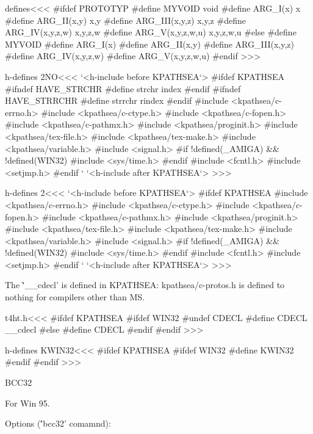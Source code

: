 {\<defines\><<<
#ifdef PROTOTYP
#define MYVOID void
#define ARG_I(x) x
#define ARG_II(x,y) x,y
#define ARG_III(x,y,z) x,y,z
#define ARG_IV(x,y,z,w) x,y,z,w
#define ARG_V(x,y,z,w,u) x,y,z,w,u
#else
#define MYVOID 
#define ARG_I(x) 
#define ARG_II(x,y) 
#define ARG_III(x,y,z) 
#define ARG_IV(x,y,z,w) 
#define ARG_V(x,y,z,w,u) 
#endif
>>>






\<h-defines 2NO\><<<
`<h-include before KPATHSEA`>
#ifdef KPATHSEA
#ifndef HAVE_STRCHR
#define  strchr  index
#endif
#ifndef HAVE_STRRCHR
#define  strrchr  rindex
#endif
#include <kpathsea/c-errno.h>
#include <kpathsea/c-ctype.h>
#include <kpathsea/c-fopen.h>
#include <kpathsea/c-pathmx.h>
#include <kpathsea/proginit.h>
#include <kpathsea/tex-file.h>
#include <kpathsea/tex-make.h>
#include <kpathsea/variable.h>
#include <signal.h>
#if !defined(_AMIGA) && !defined(WIN32)
#include <sys/time.h>
#endif
#include <fcntl.h>
#include <setjmp.h>
#endif `%
`<h-include after KPATHSEA`>
>>>

\<h-defines 2\><<<
`<h-include before KPATHSEA`>
#ifdef KPATHSEA
#include <kpathsea/c-errno.h>
#include <kpathsea/c-ctype.h>
#include <kpathsea/c-fopen.h>
#include <kpathsea/c-pathmx.h>
#include <kpathsea/proginit.h>
#include <kpathsea/tex-file.h>
#include <kpathsea/tex-make.h>
#include <kpathsea/variable.h>
#include <signal.h>
#if !defined(_AMIGA) && !defined(WIN32)
#include <sys/time.h>
#endif
#include <fcntl.h>
#include <setjmp.h>
#endif `%
`<h-include after KPATHSEA`>
>>>


The \`'__cdecl' is defined in KPATHSEA: kpathsea/c-protos.h 
is defined to nothing for compilers
other than MS.

\<t4ht.h\><<<
#ifdef KPATHSEA
#ifdef WIN32
#undef CDECL
#define CDECL                     __cdecl
#else
#define CDECL
#endif
#endif
>>>

\<h-defines KWIN32\><<<
#ifdef KPATHSEA
#ifdef WIN32
#define KWIN32  
#endif
#endif
>>>







\List{}
\item {BCC32}  

For Win 95.

Options (\''bcc32' comamnd):

}
